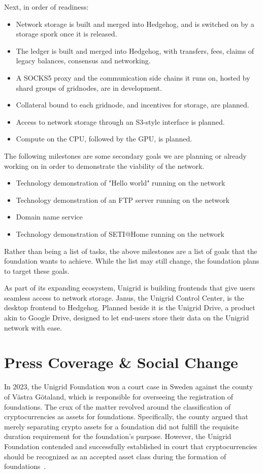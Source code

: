 \documentclass[a4paper,oneside]{article}
\begin{document}
\noindent Next, in order of readiness:
\begin{itemize}
  \item Network storage is built and merged into Hedgehog, and is switched on by a storage spork once it is released.
  \item The ledger is built and merged into Hedgehog, with transfers, fees, claims of legacy balances, consensus and networking.
  \item A SOCKS5 proxy and the communication side chains it runs on, hosted by shard groups of gridnodes, are in development.
  \item Collateral bound to each gridnode, and incentives for storage, are planned.
  \item Access to network storage through an S3-style interface is planned.
  \item Compute on the CPU, followed by the GPU, is planned.
\end{itemize}

\noindent The following milestones are some secondary goals we are planning or already working on in order to demonstrate the viability of the network.
\begin{itemize}
  \item Technology demonstration of "Hello world" running on the network
  \item Technology demonstration of an FTP server running on the network
  \item Domain name service
  \item Technology demonstration of SETI@Home running on the network
\end{itemize}

\noindent Rather than being a list of tasks, the above milestones are a list of goals that the foundation wants to achieve. While the list may still change, the foundation plans to target these goals.

As part of its expanding ecosystem, Unigrid is building frontends that give users seamless access to network storage. Janus, the Unigrid Control Center, is the desktop frontend to Hedgehog. Planned beside it is the Unigrid Drive, a product akin to Google Drive, designed to let end-users store their data on the Unigrid network with ease.

\section{Press Coverage \& Social Change}
In 2023, the Unigrid Foundation won a court case in Sweden against the county of Västra Götaland, which is responsible for overseeing the registration of foundations. The crux of the matter revolved around the classification of cryptocurrencies as assets for foundations. Specifically, the county argued that merely separating crypto assets for a foundation did not fulfill the requisite duration requirement for the foundation's purpose. However, the Unigrid Foundation contended and successfully established in court that cryptocurrencies should be recognized as an accepted asset class during the formation of foundations~\cite{decentralized-internet,linkedin-paulk,linkedin-valuexag}.
\end{document}
